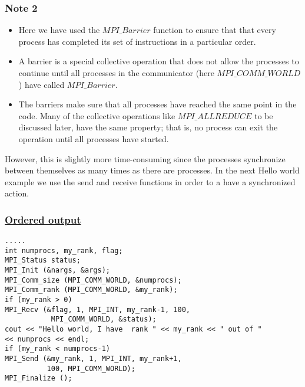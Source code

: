 \documentclass{beamer}
\begin{document}
\begin{frame}
\frametitle{Note 2}

\begin{block}{}
\begin{itemize}
\item Here we have used the $MPI\_Barrier$ function to ensure that that every process has completed  its set of instructions in  a particular order.

\item A barrier is a special collective operation that does not allow the processes to continue until all processes in the communicator (here $MPI\_COMM\_WORLD$) have called $MPI\_Barrier$. 

\item The barriers make sure that all processes have reached the same point in the code. Many of the collective operations like $MPI\_ALLREDUCE$ to be discussed later, have the same property; that is, no process can exit the operation until all processes have started. 
\end{itemize}

\noindent
However, this is slightly more time-consuming since the processes synchronize between themselves as many times as there
are processes.  In the next Hello world example we use the send and receive functions in order to a have a synchronized
action.

\end{block}
\end{frame}

\begin{frame}
\frametitle{\href{{https://github.com/CompPhysics/ComputationalPhysics2/blob/gh-pages/doc/Programs/LecturePrograms/programs/MPI/chapter07/program4.cpp}}{Ordered output}}

\begin{block}{}

















\begin{Verbatim}[numbers=none,fontsize=\fontsize{9pt}{9pt},baselinestretch=0.95]
.....
int numprocs, my_rank, flag;
MPI_Status status;
MPI_Init (&nargs, &args);
MPI_Comm_size (MPI_COMM_WORLD, &numprocs);
MPI_Comm_rank (MPI_COMM_WORLD, &my_rank);
if (my_rank > 0)
MPI_Recv (&flag, 1, MPI_INT, my_rank-1, 100, 
           MPI_COMM_WORLD, &status);
cout << "Hello world, I have  rank " << my_rank << " out of " 
<< numprocs << endl;
if (my_rank < numprocs-1)
MPI_Send (&my_rank, 1, MPI_INT, my_rank+1, 
          100, MPI_COMM_WORLD);
MPI_Finalize ();

\end{Verbatim}


\end{block}
\end{frame}
\end{document}
